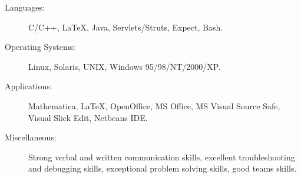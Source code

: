 

\begin{description}
\item[Languages:]
C/C++, \LaTeX, Java, Servlets/Struts, Expect, Bash.
\item[Operating Systems:]
Linux, Solaris, UNIX, Windows 95/98/NT/2000/XP.
\item[Applications:]
Mathematica, \LaTeX, OpenOffice, MS Office, MS Visual Source Safe, Visual Slick Edit, Netbeans IDE.
\item[Miscellaneous:]
Strong verbal and written communication skills, excellent troubleshooting and debugging skills, 
exceptional problem solving skills, good teams skills.
\end{description}
